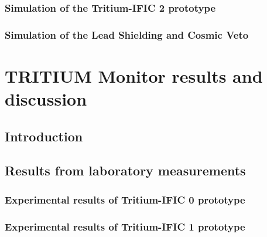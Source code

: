 \documentclass[12pt,a4paper]{book}
\begin{document}
		\subsection[Tritium-IFIC 2]{Simulation of the Tritium-IFIC 2 prototype}\label{subsec:TritiumIFIC2Simulation}
		
		
		\subsection[Lead Shielding and Cosmic Veto]{Simulation of the Lead Shielding and Cosmic Veto}\label{subsec:LeadCosmicSimulation}
		
				
\chapter[Results and discussion]{TRITIUM Monitor results and discussion}\label{chap:ResultsPrototypes}
	\section{Introduction}\label{sec:IntroResultsPrototypes}
	
	\newpage
	
	\section{Results from laboratory measurements}\label{sec:ResultsLaboratoryPrototypes}
	
	\newpage
		
		\subsection{Experimental results of Tritium-IFIC 0 prototype}\label{subsec:ResultsTritiumIFIC0}
		
		
		\subsection{Experimental results of Tritium-IFIC 1 prototype}\label{subsec:ResultsTritiumIFIC1}
		
		
\end{document}
